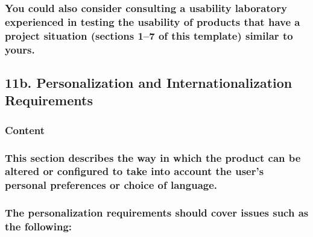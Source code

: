 \documentclass[
]{article}
\begin{document}
\hypertarget{you-could-also-consider-consulting-a-usability-laboratory-experienced-in-testing-the-usability-of-products-that-have-a-project-situation-sections-17-of-this-template-similar-to-yours.}{%
\subsubsection{You could also consider consulting a usability laboratory
experienced in testing the usability of products that have a project
situation (sections 1--7 of this template) similar to
yours.}\label{you-could-also-consider-consulting-a-usability-laboratory-experienced-in-testing-the-usability-of-products-that-have-a-project-situation-sections-17-of-this-template-similar-to-yours.}}

\hypertarget{b.-personalization-and-internationalization-requirements}{%
\subsection{11b. Personalization and Internationalization
Requirements}\label{b.-personalization-and-internationalization-requirements}}

\hypertarget{content-33}{%
\subsubsection{Content}\label{content-33}}

\hypertarget{this-section-describes-the-way-in-which-the-product-can-be-altered-or-configured-to-take-into-account-the-users-personal-preferences-or-choice-of-language.}{%
\subsubsection{\texorpdfstring{This section describes the way in which
the product can be altered or configured to take into account the user's
personal preferences or choice of language.
}{This section describes the way in which the product can be altered or configured to take into account the user's personal preferences or choice of language. }}\label{this-section-describes-the-way-in-which-the-product-can-be-altered-or-configured-to-take-into-account-the-users-personal-preferences-or-choice-of-language.}}

\hypertarget{the-personalization-requirements-should-cover-issues-such-as-the-following}{%
\subsubsection{The personalization requirements should cover issues such
as the
following:}\label{the-personalization-requirements-should-cover-issues-such-as-the-following}}
\end{document}
